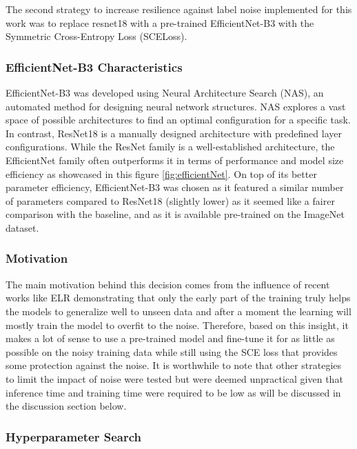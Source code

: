 \documentclass[11pt,twocolumn,letterpaper]{article}
\begin{document}
The second strategy to increase resilience against label noise implemented for this work was to replace resnet18 with a pre-trained EfficientNet-B3 with the Symmetric Cross-Entropy Loss (SCELoss).

\subsubsection*{EfficientNet-B3 Characteristics}

EfficientNet-B3 was developed using Neural Architecture Search (NAS), an automated method for designing neural network structures. NAS explores a vast space of possible architectures to find an optimal configuration for a specific task. In contrast, ResNet18 is a manually designed architecture with predefined layer configurations. While the ResNet family is a well-established architecture, the EfficientNet family often outperforms it in terms of performance and model size efficiency as showcased in this figure \ref{fig:efficientNet}. On top of its better parameter efficiency, EfficientNet-B3 was chosen as it featured a similar number of parameters compared to ResNet18 (slightly lower) as it seemed like a fairer comparison with the baseline, and as it is available pre-trained on the ImageNet dataset.   

\subsubsection*{Motivation}
The main motivation behind this decision comes from the influence of recent works like ELR \cite{liuEarlyLearningRegularizationPrevents2020} demonstrating that only the early part of the training truly helps the models to generalize well to unseen data and after a moment the learning will mostly train the model to overfit to the noise. Therefore, based on this insight, it makes a lot of sense to use a pre-trained model and fine-tune it for as little as possible on the noisy training data while still using the SCE loss that provides some protection against the noise. It is worthwhile to note that other strategies to limit the impact of noise were tested but were deemed unpractical given that inference time and training time were required to be low as will be discussed in the discussion section below.

\subsubsection*{Hyperparameter Search}
\end{document}
